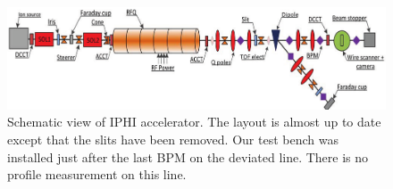\begin{figure}[!ht]
  \begin{center}
    \includegraphics[width=\textwidth]{04_IPHI_Test/figures/fig000_IPHI_view.png}
  \end{center}
  \caption[Schematic view of IPHI accelerator]{Schematic view of IPHI accelerator. The layout is almost up to date except that the slits have been removed. Our test bench was installed just after the last BPM on the deviated line.
    There is no profile measurement on this line.}
  \label{chap4:IPHI_view}
\end{figure}